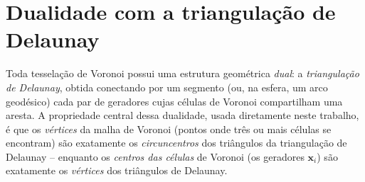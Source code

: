 \section{Dualidade com a triangulação de Delaunay}
\label{sec:dualidade}

Toda tesselação de Voronoi possui uma estrutura geométrica \emph{dual}: a
\emph{triangulação de Delaunay}, obtida conectando por um segmento (ou,
na esfera, um arco geodésico) cada par de geradores cujas células de
Voronoi compartilham uma aresta. A propriedade central dessa dualidade,
usada diretamente neste trabalho, é que os \emph{vértices} da malha de
Voronoi (pontos onde três ou mais células se encontram) são exatamente os
\emph{circuncentros} dos triângulos da triangulação de Delaunay --
enquanto os \emph{centros das células} de Voronoi (os geradores
$\mathbf{x}_i$) são exatamente os \emph{vértices} dos triângulos de
Delaunay.


